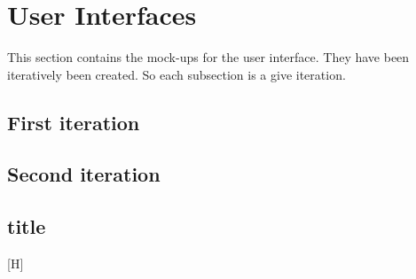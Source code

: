 \section{User Interfaces}
This section contains the mock-ups for the user interface. They have been iteratively been created. So each subsection is a give iteration. 
 
\subsection{First iteration}


\subsection{Second iteration}
\subsection{title}
[H]
